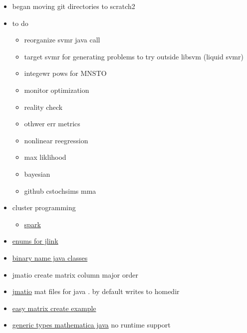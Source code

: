 \documentclass[hyperref]{labbook}
\begin{document}
\begin{itemize}
\item began moving git directories to scratch2
\item to do
  \begin{itemize}
  \item reorganize svmr java call
  \item target svmr  for generating problems to try outside libsvm (liquid svmr)
  \item integewr pows for MNSTO
  \item monitor optimization
  \item reality check
  \item othwer err metrics
  \item nonlinear reegression
  \item max liklihood
  \item bayesian
  \item github cstochsims mma
  \end{itemize}
\item cluster programming
  \begin{itemize}
  \item \href{http://stanford.edu/~rezab/slides/bayacm_spark.pdf}{spark}
  \end{itemize}

\end{itemize}



\begin{itemize}
\item \href{https://mathematica.stackexchange.com/questions/22714/using-enum-values-with-j-link}{enums for jlink}
\item \href{http://docs.oracle.com/javase/specs/jls/se7/html/jls-13.html#jls-13.1}{binary name java classes}
\end{itemize}




\begin{itemize}
\item jmatio create matrix column major order
\end{itemize}

\begin{itemize}
\item \href{http://www.programcreek.com/java-api-examples/index.php?api=com.jmatio.io.MatFileReader}{jmatio}  mat files for java  .  by default writes to homedir
\item \href{http://intra.csb.ethz.ch/javadoc/metabolic/com/jmatio/io/MatFileWriter.html}{easy matrix create example}
\item \href{https://mathematica.stackexchange.com/questions/64756/creating-a-generic-empty-list-with-jlink}{generic types mathematica java}  no runtime support
\end{itemize}
\end{document}
